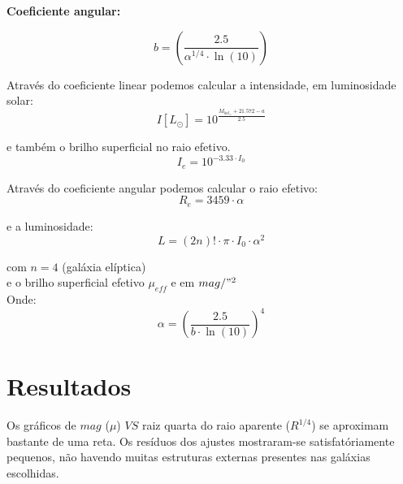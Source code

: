 \documentclass[a4paper, 11pt, fleqn, leqno]{article}
\begin{document}
\noindent \textbf{Coeficiente angular:}

\begin{equation*}
	b = \left( \frac{2.5}{\alpha^{1/4} \cdot \ln{(10)}} \right)
\end{equation*}

\noindent Através do coeficiente linear podemos calcular a intensidade, em luminosidade solar:\\

\begin{equation*}
	I [L_{\odot}] = 10^{ \frac{M_{bol_{\odot}} + 21.572 - a}{2.5} }
\end{equation*}

\noindent e também o brilho superficial no raio efetivo.\\

\begin{equation*}
	I_{e} = 10^{ -3.33 \cdot I_{0} }
\end{equation*}

\noindent Através do coeficiente angular podemos calcular o raio efetivo:\\

\begin{equation*}
	R_{e} = 3459 \cdot \alpha
\end{equation*}

\noindent e a luminosidade:\\

\begin{equation*}
	L = (2n)! \cdot \pi \cdot I_{0} \cdot \alpha^{2}
\end{equation*}

\noindent com $n = 4$ (galáxia elíptica)\\

\noindent e o brilho superficial efetivo $\mu_{eff}$ e em $mag/"^{2}$ \\

\noindent Onde:\\

\begin{equation*}
	\alpha = \left( \frac{2.5}{b \cdot \ln{(10)}} \right)^{4}
\end{equation*}

\newpage
\section{Resultados}

\noindent Os gráficos de $mag$ ($\mu$) $VS$ raiz quarta do raio aparente ($R^{1/4}$) se aproximam bastante de uma reta. Os resíduos dos ajustes mostraram-se satisfatóriamente pequenos, não havendo muitas estruturas externas presentes nas galáxias escolhidas.\\
\end{document}
